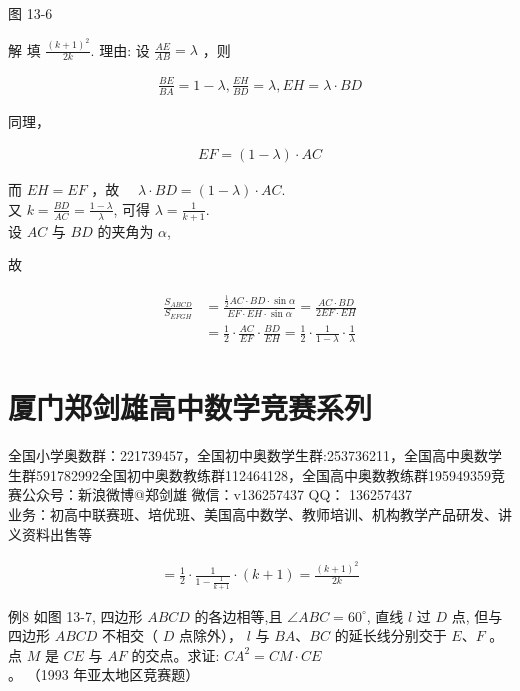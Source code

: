 \documentclass[10pt]{article}
\begin{document}
图 13-6

解 填 $\frac{(k+1)^{2}}{2 k}$. 理由: 设 $\frac{A E}{A B}=\lambda$ ，则

\begin{align*}
\frac{B E}{B A}=1-\lambda, \frac{E H}{B D}=\lambda, E H=\lambda \cdot B D
\end{align*}

同理，

\begin{align*}
E F=(1-\lambda) \cdot A C
\end{align*}

而 $E H=E F$ ，故 $\quad \lambda \cdot B D=(1-\lambda) \cdot A C$.\\
又 $k=\frac{B D}{A C}=\frac{1-\lambda}{\lambda}$, 可得 $\lambda=\frac{1}{k+1}$.\\
设 $A C$ 与 $B D$ 的夹角为 $\alpha$,

故

\begin{align*}
\begin{aligned}
\frac{S_{A B C D}}{S_{E F G H}} & =\frac{\frac{1}{2} A C \cdot B D \cdot \sin \alpha}{E F \cdot E H \cdot \sin \alpha}=\frac{A C \cdot B D}{2 E F \cdot E H} \\
& =\frac{1}{2} \cdot \frac{A C}{E F} \cdot \frac{B D}{E H}=\frac{1}{2} \cdot \frac{1}{1-\lambda} \cdot \frac{1}{\lambda}
\end{aligned}
\end{align*}

\section*{厦门郑剑雄高中数学竞赛系列}
全国小学奥数群：221739457，全国初中奥数学生群:253736211，全国高中奥数学生群591782992全国初中奥数教练群112464128，全国高中奥数教练群195949359竞赛公众号：新浪微博@郑剑雄 微信：v136257437 QQ： 136257437\\
业务：初高中联赛班、培优班、美国高中数学、教师培训、机构教学产品研发、讲义资料出售等

\begin{align*}
=\frac{1}{2} \cdot \frac{1}{1-\frac{1}{k+1}} \cdot(k+1)=\frac{(k+1)^{2}}{2 k}
\end{align*}

例8 如图 13-7, 四边形 $A B C D$ 的各边相等,且 $\angle A B C=60^{\circ}$, 直线 $l$ 过 $D$ 点, 但与四边形 $A B C D$ 不相交（ $D$ 点除外）， $l$ 与 $B A 、 B C$ 的延长线分别交于 $E 、 F$ 。点 $M$ 是 $C E$ 与 $A F$ 的交点。求证: $C A^{2}=C M \cdot C E$ 。 （1993 年亚太地区竞赛题）
\end{document}
